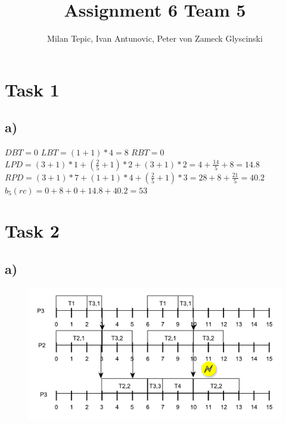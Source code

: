 \documentclass[10pt,a4paper]{article}
\author{Milan Tepic, Ivan Antunovic, Peter von Zameck Glyscinski}
\title{Assignment 6 Team 5}
\begin{document}
\maketitle
\section*{Task 1}
\subsection*{a)}
$DBT = 0$
\newline
$LBT = (1+1) * 4 = 8$
\newline
$RBT = 0$
\newline
$LPD = (3 + 1) * 1 + (\frac{2}{5} + 1) * 2 + (3 + 1) * 2 = 4 + \frac{14}{5} + 8 = 14.8$
\newline
$RPD = (3 + 1) * 7 + (1 + 1) * 4 + (\frac{2}{5} + 1) * 3 = 28 + 8 + \frac{21}{5} = 40.2$
\newline
$b_5(rc) = 0 + 8 + 0 + 14.8 + 40.2 = 53$

\section*{Task 2}
\subsection*{a)}
\begin{figure}
\includegraphics[width=\textwidth]{Task2a.pdf}
\end{figure}
\end{document}

